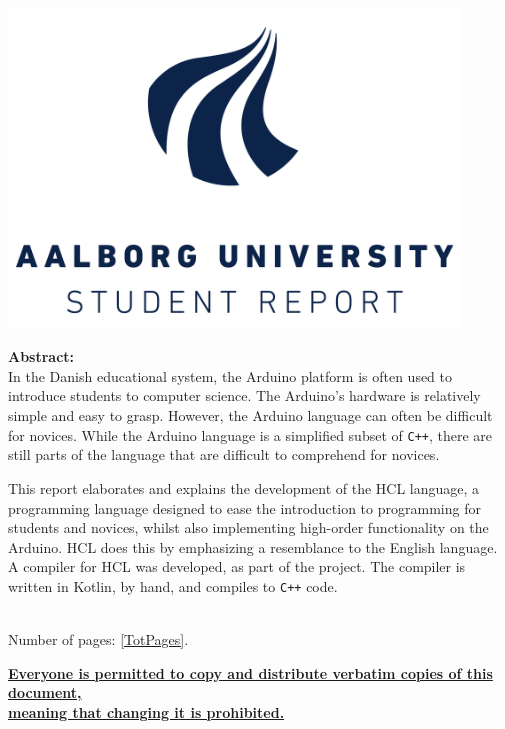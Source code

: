 \begin{minipage}[T]{0.45\textwidth}
 \begin{flushright}
  \includegraphics[width=0.9\textwidth]{images/aau_logo.pdf}\\[1.0 cm]
 \end{flushright}
 \begin{flushleft}
  \textbf{Abstract:}\\
  In the Danish educational system, the Arduino platform is often used to introduce students to computer science. 
  The Arduino's hardware is relatively simple and easy to grasp. 
  However, the Arduino language can often be difficult for novices.
  While the Arduino language is a simplified subset of \texttt{C++}, there are still parts of the language that are difficult to comprehend for novices.
  
  This report elaborates and explains the development of the HCL language, a programming language designed to ease the introduction to programming for students and novices, whilst also implementing high-order functionality on the Arduino.
  HCL does this by emphasizing a resemblance to the English language.
  A compiler for HCL was developed, as part of the project.
  The compiler is written in Kotlin, by hand, and compiles to \texttt{C++} code.
  
  
 \end{flushleft}
\end{minipage}\\
Number of pages: \ref{TotPages}.\\
\begin{center}
 \begin{scriptsize}
  \textbf{\underline{Everyone is permitted to copy and distribute verbatim copies of this document,}}\\ \textbf{\underline{ meaning that changing it is prohibited.}}
 \end{scriptsize}
\end{center}
